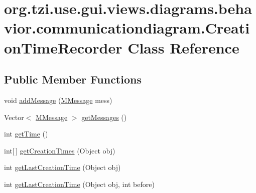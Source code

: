 \hypertarget{classorg_1_1tzi_1_1use_1_1gui_1_1views_1_1diagrams_1_1behavior_1_1communicationdiagram_1_1_creation_time_recorder}{\section{org.\-tzi.\-use.\-gui.\-views.\-diagrams.\-behavior.\-communicationdiagram.\-Creation\-Time\-Recorder Class Reference}
\label{classorg_1_1tzi_1_1use_1_1gui_1_1views_1_1diagrams_1_1behavior_1_1communicationdiagram_1_1_creation_time_recorder}
}
\subsection*{Public Member Functions}
\begin{DoxyCompactItemize}
\item 
void \hyperlink{classorg_1_1tzi_1_1use_1_1gui_1_1views_1_1diagrams_1_1behavior_1_1communicationdiagram_1_1_creation_time_recorder_a40ebf157ad975439f38d24981bb040b4}{add\-Message} (\hyperlink{classorg_1_1tzi_1_1use_1_1gui_1_1views_1_1diagrams_1_1behavior_1_1communicationdiagram_1_1_m_message}{M\-Message} mess)
\item 
Vector$<$ \hyperlink{classorg_1_1tzi_1_1use_1_1gui_1_1views_1_1diagrams_1_1behavior_1_1communicationdiagram_1_1_m_message}{M\-Message} $>$ \hyperlink{classorg_1_1tzi_1_1use_1_1gui_1_1views_1_1diagrams_1_1behavior_1_1communicationdiagram_1_1_creation_time_recorder_acf1381f8526c1b6e0cda190513889fb0}{get\-Messages} ()
\item 
int \hyperlink{classorg_1_1tzi_1_1use_1_1gui_1_1views_1_1diagrams_1_1behavior_1_1communicationdiagram_1_1_creation_time_recorder_a7294a86950cb3ad3b520db0f16149860}{get\-Time} ()
\item 
int\mbox{[}$\,$\mbox{]} \hyperlink{classorg_1_1tzi_1_1use_1_1gui_1_1views_1_1diagrams_1_1behavior_1_1communicationdiagram_1_1_creation_time_recorder_ac0ffe05c2338a33759a6e53566502342}{get\-Creation\-Times} (Object obj)
\item 
int \hyperlink{classorg_1_1tzi_1_1use_1_1gui_1_1views_1_1diagrams_1_1behavior_1_1communicationdiagram_1_1_creation_time_recorder_a8cfc0ef5575c332b0470940f78349873}{get\-Last\-Creation\-Time} (Object obj)
\item 
int \hyperlink{classorg_1_1tzi_1_1use_1_1gui_1_1views_1_1diagrams_1_1behavior_1_1communicationdiagram_1_1_creation_time_recorder_a8a931a5b76ae19fc0b584abf630b6b8b}{get\-Last\-Creation\-Time} (Object obj, int before)
\end{DoxyCompactItemize}


